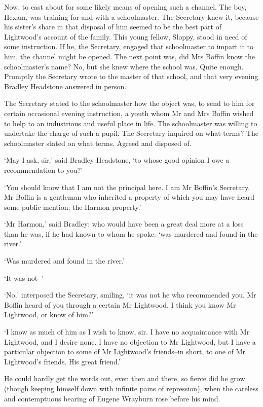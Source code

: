 Now, to cast about for some likely means of opening such a channel. The
boy, Hexam, was training for and with a schoolmaster. The Secretary knew
it, because his sister’s share in that disposal of him seemed to be
the best part of Lightwood’s account of the family. This young fellow,
Sloppy, stood in need of some instruction. If he, the Secretary, engaged
that schoolmaster to impart it to him, the channel might be opened. The
next point was, did Mrs Boffin know the schoolmaster’s name? No, but she
knew where the school was. Quite enough. Promptly the Secretary wrote
to the master of that school, and that very evening Bradley Headstone
answered in person.

The Secretary stated to the schoolmaster how the object was, to send to
him for certain occasional evening instruction, a youth whom Mr and Mrs
Boffin wished to help to an industrious and useful place in life. The
schoolmaster was willing to undertake the charge of such a pupil. The
Secretary inquired on what terms? The schoolmaster stated on what terms.
Agreed and disposed of.

‘May I ask, sir,’ said Bradley Headstone, ‘to whose good opinion I owe a
recommendation to you?’

‘You should know that I am not the principal here. I am Mr Boffin’s
Secretary. Mr Boffin is a gentleman who inherited a property of which
you may have heard some public mention; the Harmon property.’

‘Mr Harmon,’ said Bradley: who would have been a great deal more at a
loss than he was, if he had known to whom he spoke: ‘was murdered and
found in the river.’

‘Was murdered and found in the river.’

‘It was not--’

‘No,’ interposed the Secretary, smiling, ‘it was not he who recommended
you. Mr Boffin heard of you through a certain Mr Lightwood. I think you
know Mr Lightwood, or know of him?’

‘I know as much of him as I wish to know, sir. I have no acquaintance
with Mr Lightwood, and I desire none. I have no objection to Mr
Lightwood, but I have a particular objection to some of Mr Lightwood’s
friends--in short, to one of Mr Lightwood’s friends. His great friend.’

He could hardly get the words out, even then and there, so fierce did
he grow (though keeping himself down with infinite pains of repression),
when the careless and contemptuous bearing of Eugene Wrayburn rose
before his mind.

